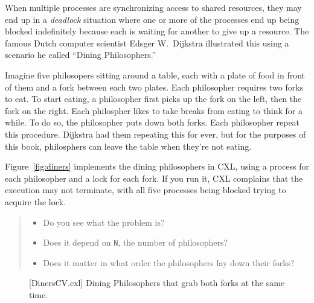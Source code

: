 \documentclass{report}
\newenvironment{code}{
\tcolorbox
}{
\endtcolorbox
}
\begin{document}
When multiple processes are synchronizing access to shared resources, they
may end up in a \emph{deadlock} situation where one or more of the processes
end up being blocked indefinitely because each is waiting for another to give
up a resource.
The famous Dutch computer scientist Edsger W.~Dijkstra illustrated this using
a scenario he called ``Dining Philosophers.''

Imagine five philosopers sitting around a table, each with a plate of food in
front of them and a fork between each two plates.  Each philosopher requires
two forks to eat.  To start eating, a philosopher first picks up the fork on
the left, then the fork on the right.  Each philospher likes to take breaks
from eating to think for a while.  To do so, the philosopher puts down both
forks.  Each philosopher repeat this procedure.  Dijkstra had them repeating
this for ever, but for the purposes of this book, philosphers can leave
the table when they're not eating.

Figure~\ref{fig:diners} implements the dining philosophers in CXL, using a
process for each philosopher and a lock for each fork.  If you
run it, CXL complains that the execution may not terminate, with all five
processes being blocked trying to acquire the lock.

\begin{quote}
\begin{itemize}
\item Do you see what the problem is?
\item Does it depend on \texttt{N}, the number of philosophers?
\item Does it matter in what order the philosophers lay down their forks?
\end{itemize}
\end{quote}


\begin{figure}
\begin{code}
\end{code}
\caption{[DinersCV.cxl] Dining Philosophers that grab both forks at the same time.}
\label{fig:dinerscv}
\end{figure}
\end{document}
